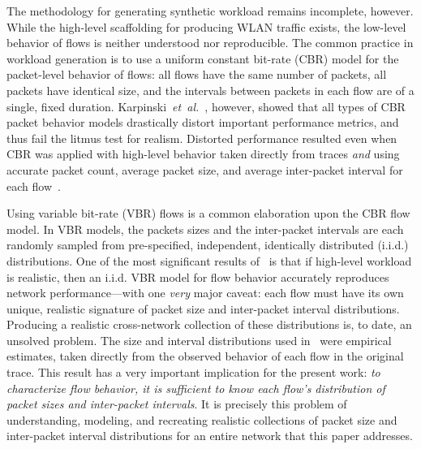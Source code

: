 \documentclass[conference]{IEEEtran}
\newcommand{\caps}[1]{{\small{#1}}}
\begin{document}
The methodology for generating synthetic workload remains incomplete, however. While the high-level scaffolding for producing \caps{WLAN} traffic exists, the low-level behavior of flows is neither understood nor reproducible. The common practice in workload generation is to use a uniform constant bit-rate (\caps{CBR}) model for the packet-level behavior of flows: all flows have the same number of packets, all packets have identical size, and the intervals between packets in each flow are of a single, fixed duration. %
Karpinski~\textit{et~al.}~\cite{Karpinski07:cbr-failure}, however, showed that all types of \caps{CBR} packet behavior models drastically distort important performance metrics, and thus fail the litmus test for realism. Distorted performance resulted even when \caps{CBR} was applied with high-level behavior taken directly from traces \textit{and} using accurate packet count, average packet size, and average inter-packet interval for each flow~\cite{Karpinski07:realism}.%

Using variable bit-rate (\caps{VBR}) flows is a common elaboration upon the \caps{CBR} flow model. In \caps{VBR} models, the packets sizes and the inter-packet intervals are each randomly sampled from pre-specified, independent, identically distributed (i.i.d.) distributions. %
One of the most significant results of~\cite{Karpinski07:realism} is that if high-level workload is realistic, then an i.i.d. \caps{VBR} model for flow behavior accurately reproduces network performance---with one \textit{very} major caveat: each flow must have its own unique, realistic signature of packet size and inter-packet interval distributions. Producing a realistic cross-network collection of these distributions is, to date, an unsolved problem. The size and interval distributions used in~\cite{Karpinski07:realism} were empirical estimates, taken directly from the observed behavior of each flow in the original trace. This result has a very important implication for the present work: \textit{to characterize flow behavior, it is sufficient to know each flow's distribution of packet sizes and inter-packet intervals}. It is precisely this problem of understanding, modeling, and recreating realistic collections of packet size and inter-packet interval distributions for an entire network that this paper addresses.
\end{document}
